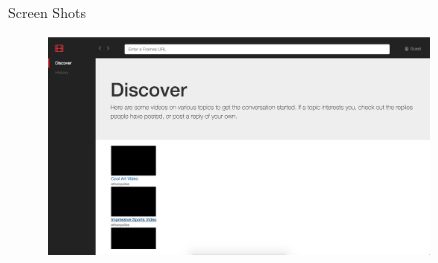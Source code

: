 \documentclass[final]{beamer}
\newlength{\sepwid}
\newlength{\onecolwid}
\newlength{\twocolwid}
\begin{document}
\begin{frame}[t]
\begin{columns}[t]
\begin{column}{\twocolwid}
\begin{columns}[t,totalwidth=\twocolwid]
\begin{column}{\onecolwid}
\begin{block}{}
\end{block}

\begin{block}{Screen Shots}

  \begin{figure}
  \includegraphics[width=0.8\linewidth]{discover-page.png}
  \captionsetup{labelformat=empty}
  \label{fig:discover-page}
  \end{figure}

\end{block}

\end{column} %

\end{columns} %


\begin{columns}[t,totalwidth=\twocolwid] %


\end{columns} %

\end{column} %

\begin{column}{\sepwid}\end{column} %

\begin{column}{\onecolwid} %


\begin{block}{}


\end{block}
\end{column}
\end{columns}
\end{frame}
\end{document}

